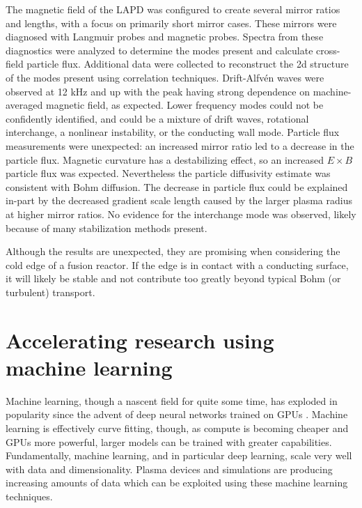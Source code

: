 The magnetic field of the LAPD was configured to create several mirror ratios and lengths, with a focus on primarily short mirror cases. These mirrors were diagnosed with Langmuir probes and magnetic probes. Spectra from these diagnostics were analyzed to determine the modes present and calculate cross-field particle flux. Additional data were collected to reconstruct the 2d structure of the modes present using correlation techniques. Drift-Alfv\'en waves were observed at 12 kHz and up with the peak having strong dependence on machine-averaged magnetic field, as expected. Lower frequency modes could not be confidently identified, and could be a mixture of drift waves, rotational interchange, a nonlinear instability, or the conducting wall mode. Particle flux measurements were unexpected: an increased mirror ratio led to a decrease in the particle flux. Magnetic curvature has a destabilizing effect, so an increased $E \times B$ particle flux was expected. Nevertheless the particle diffusivity estimate was consistent with Bohm diffusion. The decrease in particle flux could be explained in-part by the decreased gradient scale length caused by the larger plasma radius at higher mirror ratios. No evidence for the interchange mode was observed, likely because of many stabilization methods present.

Although the results are unexpected, they are promising when considering the cold edge of a fusion reactor. If the edge is in contact with a conducting surface, it will likely be stable and not contribute too greatly beyond typical Bohm (or turbulent) transport. 

\section{Accelerating research using machine learning}

Machine learning, though a nascent field for quite some time, has exploded in popularity since the advent of deep neural networks trained on GPUs \cite{krizhevsky_imagenet_2017}. Machine learning is effectively curve fitting, though, as compute is becoming cheaper and GPUs more powerful, larger models can be trained with greater capabilities. Fundamentally, machine learning, and in particular deep learning, scale very well with data and dimensionality. Plasma devices and simulations are producing increasing amounts of data which can be exploited using these machine learning techniques.

